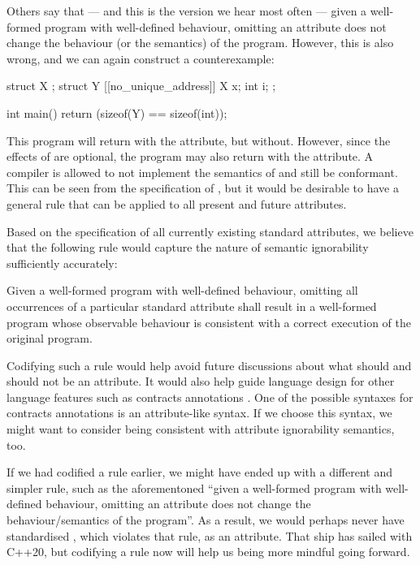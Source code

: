Others say that --- and this is the version we hear most often --- given a well-formed program with well-defined behaviour, omitting an attribute does not change the behaviour (or the semantics) of the program. However, this is also wrong, and we can again construct a counterexample:

\begin{codeblock}
struct X {};
struct Y {
  [[no_unique_address]] X x;
  int i; 
};

int main() { return (sizeof(Y) == sizeof(int)); }
\end{codeblock}

This program will return  with the attribute, but  without. However, since the effects of \mbox{} are optional, the program may also return  with the attribute. A compiler is allowed to not implement the semantics of  and still be conformant. This can be seen from the specification of , but it would be desirable to have a general rule that can be applied to all present and future attributes.

Based on the specification of all currently existing standard attributes, we believe that the following rule would capture the nature of semantic ignorability sufficiently accurately:

\begin{adjustwidth}{0.5cm}{0.5cm}
Given a well-formed program with well-defined behaviour, omitting all occurrences of a particular standard attribute shall result in a well-formed program whose observable behaviour is consistent with a correct execution of the original program.
\end{adjustwidth}

Codifying such a rule would help avoid future discussions about what should and should not be an attribute. It would also help guide language design for other language features such as contracts annotations \cite{P2521R2}. One of the possible syntaxes for contracts annotations is an attribute-like syntax. If we choose this syntax, we might want to consider being consistent with attribute ignorability semantics, too.

If we had codified a rule earlier, we might have ended up with a different and simpler rule, such as the aforementoned ``given a well-formed program with well-defined behaviour, omitting an attribute does not change the behaviour/semantics of the program''. As a result, we would perhaps never have standardised \mbox{}, which violates that rule, as an attribute. That ship has sailed with C++20, but codifying a rule now will help us being more mindful going forward.


